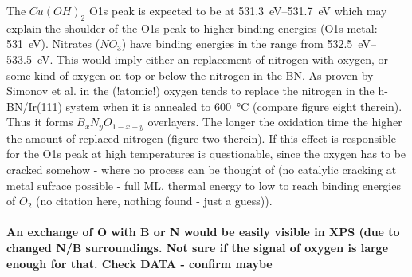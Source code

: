 The $Cu(OH)_2$ O1s peak is expected to be at \SIrange{531.3}{531.7}{\eV}\cite{deroubaix_x-ray_1992} which may explain the shoulder of the O1s peak to higher binding energies (O1s metal: \SI{531}{\eV}). Nitrates ($NO_3$) have binding energies in the range from \SIrange{532.5}{533.5}{\eV}\cite[45]{wanger_handbook_1979}. This would imply either an replacement of nitrogen with oxygen, or some kind of oxygen on top or below the nitrogen in the BN. As proven by Simonov et al. in \cite{simonov_controllable_2012} the (!atomic!) oxygen tends to replace the nitrogen in the h-BN/Ir(111) system when it is annealed to \SI{600}{\degreeCelsius} (compare figure eight therein). Thus it forms $B_{x}N_{y}O_{1-x-y}$ overlayers. The longer the oxidation time the higher the amount of replaced nitrogen (figure two therein). If this effect is responsible for the O1s peak at high temperatures is questionable, since the oxygen has to be cracked somehow - where no process can be thought of (no catalylic cracking at metal sufrace possible - full ML, thermal energy to low to reach binding energies of $O_2$ (no citation here, nothing found - just a guess)).
% 
% 
\paragraph{An exchange of O with B or N would be easily visible in XPS (due to changed N/B surroundings. Not sure if the signal of oxygen is large enough for that. Check DATA - confirm maybe}